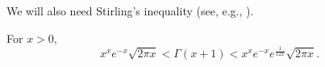 

%
\vspace{2mm}

We will also need Stirling's inequality (see, e.g., \cite{artin}).

\begin{lemma}\label{stirlingineq}
	For $x>0$,
	\[x^x e^{-x}\sqrt{2\pi x} < \Gamma(x+1) < x^x e^{-x} e^{\frac{1}{12x}}\sqrt{2\pi x} .\]
\end{lemma}


